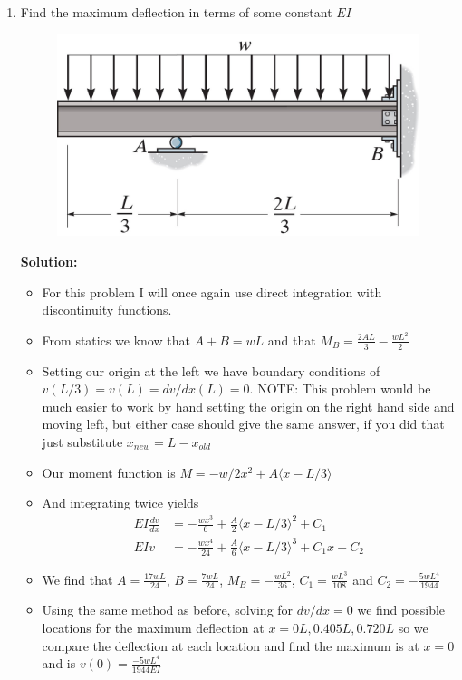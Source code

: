 \documentclass[12pt, oneside]{article}
\begin{document}
\begin{enumerate}
	\item %
		Find the maximum deflection in terms of some constant $EI$
		\begin{figure}[H]
			\centering
			\includegraphics[width=0.6\linewidth]{12-107}
		\end{figure}
			\textbf{Solution:}
			\begin{itemize}
				\item For this problem I will once again use direct integration with discontinuity functions.
				\item From statics we know that $A + B = wL$ and that $M_B = \frac{2AL}{3} - \frac{wL^2}{2}$
				\item Setting our origin at the left we have boundary conditions of $v(L/3) = v(L) = dv/dx(L) = 0$. NOTE: This problem would be much easier to work by hand setting the origin on the right hand side and moving left, but either case should give the same answer, if you did that just substitute $x_{new} = L - x_{old}$
				\item Our moment function is $M = -w/2 x^2 + A\langle x - L/3 \rangle$
				\item And integrating twice yields
					\begin{align*}
						EI \frac{dv}{dx} &= -\frac{wx^3}{6} + \frac{A}{2} \langle x - L/3 \rangle^2 + C_1\\
						EI v &= -\frac{wx^4}{24} + \frac{A}{6} \langle x - L/3 \rangle^3 + C_1x + C_2
					\end{align*}
				\item We find that $A = \frac{17wL}{24}$, $B = \frac{7 wL}{24}$, $M_B = -\frac{wL^2}{36}$, $C_1 = \frac{wL^3}{108}$ and $C_2 = -\frac{5wL^4}{1944}$
				\item Using the same method as before, solving for $dv/dx=0$ we find possible locations for the maximum deflection at $x=0L, 0.405L, 0.720L$ so we compare the deflection at each location and find the maximum is at $x=0$ and is $v(0) = \frac{-5wL^4}{1944EI}$
			\end{itemize}


\end{enumerate}
\end{document}
